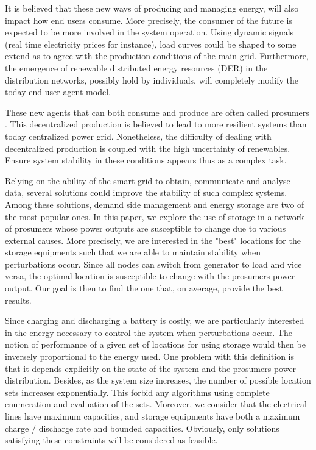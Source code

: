 \documentclass[conference]{IEEEtran}
\begin{document}
It is believed that these new ways of producing and managing energy, will also impact how end users consume. More precisely, the consumer   of the future is expected to be more involved in the system operation. Using dynamic signals (real time electricity prices for instance), load curves could be shaped to some extend as to agree with the production conditions of the main grid.
Furthermore, the emergence of renewable distributed energy resources (DER) in the distribution networks, possibly hold by individuals,
will completely modify the today end user agent model.

These new agents that can both consume and produce are often called prosumers \cite{Rathnayaka2012}. This decentralized production is believed to lead to more resilient systems than today centralized power grid. Nonetheless, the difficulty of dealing with decentralized production is coupled with the high uncertainty of renewables. Ensure system stability in these conditions appears thus as a complex task. 

Relying on the ability of the smart grid to obtain, communicate and analyse data, several solutions could  improve the stability of such complex systems. Among these solutions, demand side management and energy storage are two of the most popular ones. In this paper, we explore the use of storage in a network of prosumers whose power outputs are susceptible to change due to various external causes. More precisely, we are interested in the "best" locations for the storage equipments such that we are able to maintain stability when  perturbations occur. Since all nodes can switch from generator to load and vice versa, the optimal location is susceptible to change with the prosumers power output.
Our goal is then to find the one that, on average, provide the best results.

Since charging and discharging a battery is costly, we are particularly interested in the energy necessary to control the system when perturbations occur. The notion of performance of a given set of locations for using storage would then be inversely proportional to the energy used. One problem with this definition is that it depends explicitly on the state of the system and the prosumers power distribution. Besides, as the system size increases, the number of possible location sets increases exponentially. This forbid any algorithms using complete enumeration and evaluation of the sets. Moreover, we consider  that the electrical lines have maximum capacities, and storage equipments have both a maximum charge / discharge rate and  bounded capacities. Obviously, only solutions satisfying these constraints will be considered as feasible.
\end{document}
